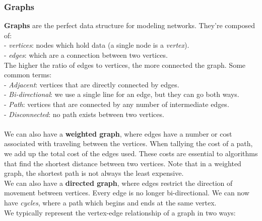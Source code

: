 \documentclass[11pt, a4paper]{article}
\begin{document}
\begin{spacing}{1.1}
	\subsubsection{Graphs}
	\textbf{Graphs} are the perfect data structure for modeling networks. They’re composed of: \\
	\hspace*{3mm} - \textit{vertices}: nodes which hold data (a single node is a \textit{vertex}). \\
	\hspace*{3mm} - \textit{edges}: which are a connection between two vertices. \vspace*{1mm} \\
	The higher the ratio of edges to vertices, the more connected the graph. Some common terms: \vspace*{1mm} \\
	\hspace*{3mm} - \textit{Adjacent}: vertices that are directly connected by edges. \\
	\hspace*{3mm} - \textit{Bi-directional}: we use a single line for an edge, but they can go both ways. \\
	\hspace*{3mm} - \textit{Path}: vertices that are connected by any number of intermediate edges. \\
	\hspace*{3mm} - \textit{Disconnected}: no path exists between two vertices. \\~\\
	We can also have a \textbf{weighted graph}, where edges have a number or cost associated with traveling between the vertices. When tallying the cost of a path, we add up the total cost of the edges used. These costs are essential to algorithms that find the shortest distance between two vertices. Note that in a weighted graph, the shortest path is not always the least expensive. \vspace*{2mm} \\
	We can also have a \textbf{directed graph}, where edges restrict the direction of movement between vertices. Every edge is no longer bi-directional. We can now have \textit{cycles}, where a path which begins and ends at the same vertex. \vspace*{2mm} \\
	We typically represent the vertex-edge relationship of a graph in two ways: \vspace*{1mm} \\

\end{spacing}
\end{document}
